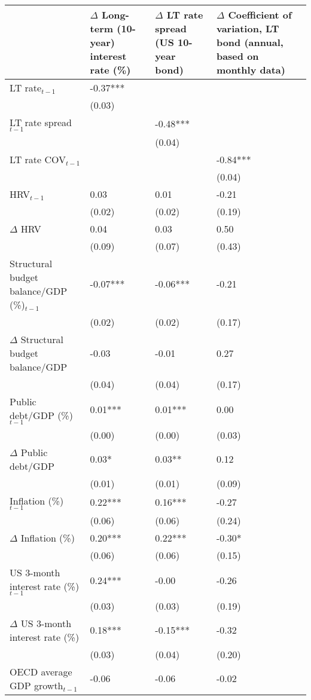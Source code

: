 {\small
\begin{tabular}{lp{3cm}p{3cm}p{3cm}}
  \hline
 & $\Delta$ Long-term (10-year) interest rate (\%) & $\Delta$ LT rate spread (US 10-year bond) & $\Delta$ Coefficient of variation, LT bond (annual, based on monthly data) \\ 
  \hline
LT rate$_{t-1}$ & -0.37*** &  &  \\ 
   & (0.03) &  &  \\ 
  LT rate spread$_{t-1}$ &  & -0.48*** &  \\ 
   &  & (0.04) &  \\ 
  LT rate COV$_{t-1}$ &  &  & -0.84*** \\ 
   &  &  & (0.04) \\ 
  HRV$_{t-1}$ & 0.03 & 0.01 & -0.21 \\ 
   & (0.02) & (0.02) & (0.19) \\ 
  $\Delta$ HRV & 0.04 & 0.03 & 0.50 \\ 
   & (0.09) & (0.07) & (0.43) \\ 
  Structural budget balance/GDP (\%)$_{t-1}$ & -0.07*** & -0.06*** & -0.21 \\ 
   & (0.02) & (0.02) & (0.17) \\ 
  $\Delta$ Structural budget balance/GDP & -0.03 & -0.01 & 0.27 \\ 
   & (0.04) & (0.04) & (0.17) \\ 
  Public debt/GDP (\%)$_{t-1}$ & 0.01*** & 0.01*** & 0.00 \\ 
   & (0.00) & (0.00) & (0.03) \\ 
  $\Delta$ Public debt/GDP & 0.03* & 0.03** & 0.12 \\ 
   & (0.01) & (0.01) & (0.09) \\ 
  Inflation (\%) $_{t-1}$ & 0.22*** & 0.16*** & -0.27 \\ 
   & (0.06) & (0.06) & (0.24) \\ 
  $\Delta$ Inflation (\%) & 0.20*** & 0.22*** & -0.30* \\ 
   & (0.06) & (0.06) & (0.15) \\ 
  US 3-month interest rate (\%)$_{t-1}$ & 0.24*** & -0.00 & -0.26 \\ 
   & (0.03) & (0.03) & (0.19) \\ 
  $\Delta$ US 3-month interest rate (\%) & 0.18*** & -0.15*** & -0.32 \\ 
   & (0.03) & (0.04) & (0.20) \\ 
  OECD average GDP growth$_{t-1}$ & -0.06 & -0.06 & -0.02 \\ 

\end{tabular}}
